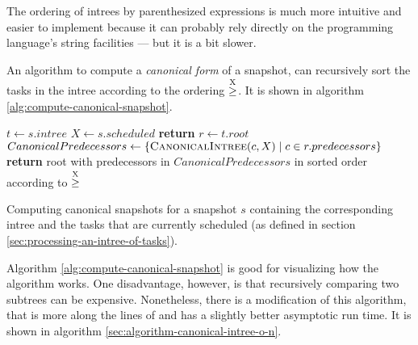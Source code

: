 The ordering of intrees by parenthesized expressions is much more intuitive and easier to implement because it can probably rely directly on the programming language's string facilities --- but it is a bit slower.

An algorithm to compute a \emph{canonical form} of a snapshot, can recursively sort the tasks in the intree according to the ordering $\stackrel{\text{X}}{\geq}$. It is shown in algorithm \ref{alg:compute-canonical-snapshot}.

\begin{algorithm}
  \begin{algorithmic}
     
    \State $t \gets s.intree$ 
    \State $X \gets s.scheduled$ 
    \State \textbf{return}  
    \EndProcedure
    \Statex
    \State $r \gets t.root$ 
    \State $CanonicalPredecessors \gets 
           \left\{ \Call{CanonicalIntree}{c, X} \mid c \in r.predecessors \right\}$
    \State \textbf{return} root with predecessors in $CanonicalPredecessors$ in sorted order according to $\stackrel{\text{X}}{\geq}$
    \EndProcedure
    \Statex
  \end{algorithmic}
  \caption{Computing canonical snapshots for a snapshot $s$ containing the corresponding intree and the tasks that are currently scheduled (as defined in section \ref{sec:processing-an-intree-of-tasks}).}
  \label{alg:compute-canonical-snapshot}
\end{algorithm}

Algorithm \ref{alg:compute-canonical-snapshot} is good for visualizing how the algorithm works. One disadvantage, however, is that recursively comparing two subtrees can be expensive. Nonetheless, there is a modification of this algorithm, that is more along the lines of \cite{aho1974design} and has a slightly better asymptotic run time. It is shown in algorithm \ref{sec:algorithm-canonical-intree-o-n}.

